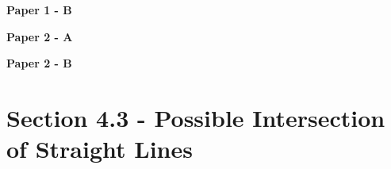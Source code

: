 \documentclass[12pt, a4paper]{article}
\begin{document}
\textbf{Paper 1 - B}
\begin{enumx}[label=\arabic*.,start=11]
\item {}\label{DSE2023-CoreP1-Q19} 
\end{enumx}
\textbf{Paper 2 - A}
\begin{enumx}[label=\arabic*.,start=12]
\item {}\label{DSE2016-CoreP2-Q25} 
\item {}\label{DSE2019-CoreP2-Q24} 
\item {}\label{DSE2020-CoreP2-Q08} 
\item {}\label{DSE2022-CoreP2-Q24} 
\item {}\label{DSE2023-CoreP2-Q25} 
\end{enumx}
\textbf{Paper 2 - B}
\begin{enumx}[label=\arabic*.,start=17]
\item {}\label{DSE2022-CoreP2-Q41} 
\item {}\label{DSE2023-CoreP2-Q41} 
\item {}\label{DSE2024-CoreP2-Q34} 
\end{enumx}




\section*{Section 4.3 - Possible Intersection of Straight Lines}\label{section:4-4-3}
\end{document}
